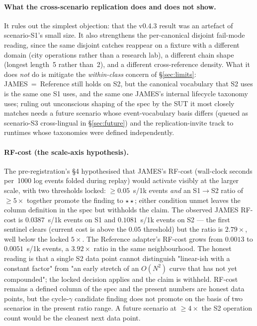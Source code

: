 \documentclass[11pt,a4paper]{article}
\begin{document}
\paragraph{What the cross-scenario replication does and does not show.} It rules out the simplest objection: that the v0.4.3 result was an artefact of scenario-S1's small size. It also strengthens the per-canonical disjoint fail-mode reading, since the same disjoint catches reappear on a fixture with a different domain (city operations rather than a research lab), a different chain shape (longest length~5 rather than~2), and a different cross-reference density. What it does \emph{not} do is mitigate the \emph{within-class} concern of §\ref{sec:limits}: JAMES~=~Reference still holds on S2, but the canonical vocabulary that S2 uses is the same one S1 uses, and the same one JAMES's internal lifecycle taxonomy uses; ruling out unconscious shaping of the spec by the SUT it most closely matches needs a future scenario whose event-vocabulary basis differs (queued as scenario-S3 cross-lingual in §\ref{sec:future}) and the replication-invite track to runtimes whose taxonomies were defined independently.

\paragraph{RF-cost (the scale-axis hypothesis).} The pre-registration's §4 hypothesised that JAMES's RF-cost (wall-clock seconds per~1000 log events folded during replay) would activate visibly at the larger scale, with two thresholds locked: $\ge 0.05$~s/1k events \emph{and} an S1$\to$S2 ratio of $\ge 5\times$ together promote the finding to $\star\star$; either condition unmet leaves the column definition in the spec but withholds the claim. The observed JAMES RF-cost is $0.0387$~s/1k events on S1 and $0.1081$~s/1k events on S2 --- the first sentinel clears (current cost is above the $0.05$ threshold) but the ratio is $2.79\times$, well below the locked $5\times$. The Reference adapter's RF-cost grows from $0.0013$ to $0.0051$~s/1k events, a $3.92\times$ ratio in the same neighbourhood. The honest reading is that a single S2 data point cannot distinguish "linear-ish with a constant factor" from "an early stretch of an $O(N^2)$ curve that has not yet compounded"; the locked decision applies and the claim is withheld. RF-cost remains a defined column of the spec and the present numbers are honest data points, but the cycle-$\gamma$ candidate finding does not promote on the basis of two scenarios in the present ratio range. A future scenario at $\ge 4\times$ the S2 operation count would be the cleanest next data point.
\end{document}
